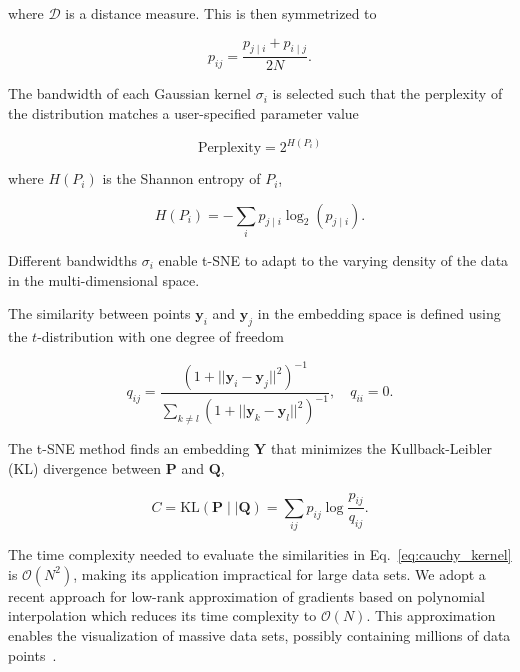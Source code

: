 \documentclass[runningheads]{llncs}
\begin{document}
\noindent where $\mathcal{D}$ is a distance measure. This is then symmetrized to

\begin{equation}
p_{ij} = \frac{p_{j \mid i} + p_{i \mid j}}{2N}.
\label{eq:symmetrize}
\end{equation}

The bandwidth of each Gaussian kernel $\sigma_i$ is selected such that the
perplexity of the distribution matches a user-specified parameter value

\begin{equation}
\text{Perplexity} = 2^{H(P_i)}
\end{equation}

\noindent where $H(P_i)$ is the Shannon entropy of $P_i$,

\begin{equation}
H(P_i) = -\sum_i p_{j \mid i} \log_2 (p_{j \mid i}).
\end{equation}

\noindent Different bandwidths $\sigma_i$ enable t-SNE to adapt to the varying
density of the data in the multi-dimensional space.

The similarity between points $\mathbf{y}_i$ and $\mathbf{y}_j$ in the
embedding space is defined using the $t$-distribution with one degree of
freedom

\begin{equation}
q_{ij} = \frac{\left ( 1 + || \mathbf{y}_i - \mathbf{y}_j ||^2 \right )^{-1}}
{\sum_{k \neq l}\left ( 1 + || \mathbf{y}_k - \mathbf{y}_l ||^2 \right )^{-1}},
\quad q_{ii} = 0.
\label{eq:cauchy_kernel}
\end{equation}

The t-SNE method finds an embedding $\mathbf{Y}$ that minimizes the
Kullback-Leibler (KL) divergence between $\mathbf{P}$ and $\mathbf{Q}$,

\begin{equation}
C = \text{KL}(\mathbf{P} \mid \mid \mathbf{Q}) = \sum_{ij} p_{ij} \log \frac{p_{ij}}{q_{ij}}.
\label{eq:kl_divergence}
\end{equation}

The time complexity needed to evaluate the similarities in
Eq.~\ref{eq:cauchy_kernel} is $\mathcal{O}(N^2)$, making its application
impractical for large data sets. We adopt a recent approach
for low-rank approximation of gradients based on polynomial interpolation which
reduces its time complexity to $\mathcal{O}(N)$. This approximation
enables the visualization of massive data sets, possibly containing millions of
data points~\cite{fi_tsne}.
\end{document}
